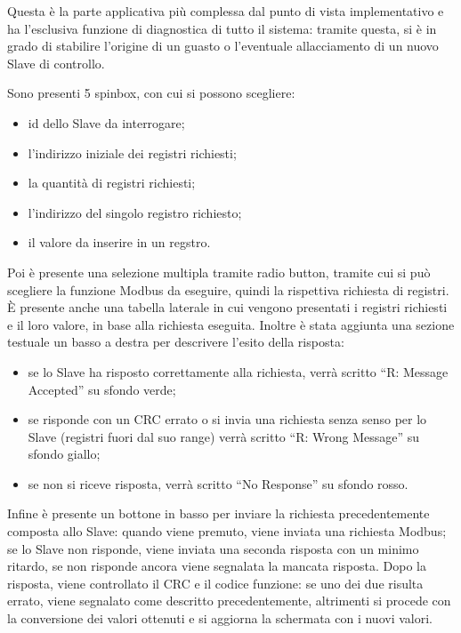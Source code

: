 \documentclass[a4paper,titlepage]{book}
\newcommand{\itema}{\begin{itemize}[noitemsep,topsep=10pt,parsep=5pt,partopsep=10pt]}
\begin{document}
Questa è la parte applicativa più complessa dal punto di vista implementativo e ha l'esclusiva funzione di diagnostica di tutto il sistema: tramite questa, si è in grado di stabilire l'origine di un guasto o l'eventuale allacciamento di un nuovo Slave di controllo.

Sono presenti 5 spinbox, con cui si possono scegliere:

\itema

\item id dello Slave da interrogare;

\item l'indirizzo iniziale dei registri richiesti;

\item la quantità di registri richiesti;

\item l'indirizzo del singolo registro richiesto;

\item il valore da inserire in un regstro.

\end{itemize}

Poi è presente una selezione multipla tramite radio button, tramite cui si può scegliere la funzione Modbus da eseguire, quindi la rispettiva richiesta di registri. È presente anche una tabella laterale in cui vengono presentati i registri richiesti e il loro valore, in base alla richiesta eseguita. Inoltre è stata aggiunta una sezione testuale un basso a destra per descrivere l'esito della risposta: 

\itema

\item se lo Slave ha risposto correttamente alla richiesta, verrà scritto ``R: Message Accepted'' su sfondo verde;
\item se risponde con un CRC errato o si invia una richiesta senza senso per lo Slave (registri fuori dal suo range) verrà scritto ``R: Wrong Message'' su sfondo giallo;
\item se non si riceve risposta, verrà scritto ``No Response'' su sfondo rosso.

\end{itemize}

Infine è presente un bottone in basso per inviare la richiesta precedentemente composta allo Slave: quando viene premuto, viene inviata una richiesta Modbus; se lo Slave non risponde, viene inviata una seconda risposta con un minimo ritardo, se non risponde ancora viene segnalata la mancata risposta. Dopo la risposta, viene controllato il CRC e il codice funzione: se uno dei due risulta errato, viene segnalato come descritto precedentemente, altrimenti si procede con la conversione dei valori ottenuti e si aggiorna la schermata con i nuovi valori.
\end{document}
